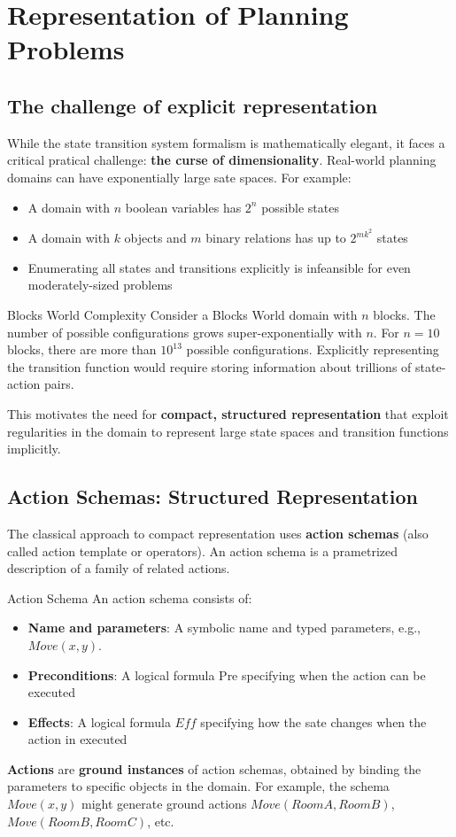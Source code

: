 \documentclass[a4paper]{article}
\theoremstyle{definition}
\begin{document}
\section{Representation of Planning Problems}
\subsection{The challenge of explicit representation}
While the state transition system formalism is mathematically elegant, it faces a critical pratical 
challenge: \textbf{the curse of dimensionality}. Real-world planning domains can have exponentially large sate
spaces. For example:
\begin{itemize}
    \item A domain with \( n \) boolean variables has \( 2^n \) possible states 
    \item A domain with \( k \) objects and \( m \) binary relations has up to \( 2^{mk^2} \) states
    \item Enumerating all states and transitions explicitly is infeansible for even moderately-sized problems
\end{itemize}
\begin{example}{Blocks World Complexity}
Consider a Blocks World domain with \( n \) blocks. The number of possible 
configurations grows super-exponentially with \( n \). For \( n = 10 \) blocks,
there are more than \( 10^13 \) possible configurations. Explicitly representing the transition 
function would require storing information about trillions of state-action pairs.
\end{example}
This motivates the need for \textbf{compact, structured representation} that exploit regularities 
in the domain to represent large state spaces and transition functions implicitly.
\subsection{Action Schemas: Structured Representation}
The classical approach to compact representation uses \textbf{action schemas} (also called action 
template or operators). An action schema is a prametrized description of a family of related actions.
\begin{definition}{Action Schema}
An action schema consists of:
\begin{itemize}
    \item \textbf{Name and parameters}: A symbolic name and typed parameters, e.g., \( Move(x,y) \).
    \item \textbf{Preconditions}: A logical formula Pre specifying when the action can be executed
    \item \textbf{Effects}: A logical formula \( Eff \) specifying how the sate changes when the action in executed
\end{itemize} 
\end{definition}
\textbf{Actions} are \textbf{ground instances} of action schemas, obtained by binding the parameters to specific objects in the 
domain. For example, the schema \( Move(x,y) \) might generate ground actions \( Move(RoomA,RoomB) \), \( Move(RoomB,RoomC) \), etc.
\end{document}
